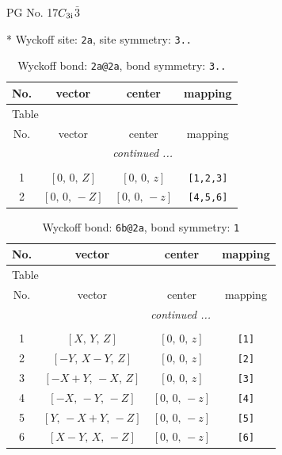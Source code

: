 \documentclass[fleqn,8pt]{jsarticle}
\begin{document}
\setcounter{MaxMatrixCols}{32}

\renewcommand{\tablename}{Table~}
\renewcommand{\figurename}{Figure~}
\begin{center}
\LARGE
PG No. 17\quad$C_{\rm 3i}$\quad$\bar{3}$\quad[ trigonal ]
\end{center}


* Wyckoff site: {\tt 2a}, site symmetry: {\tt 3..}
\renewcommand{\arraystretch}{1.2}
\begin{longtable}{cccc}
\caption{Wyckoff bond: {\tt 2a@2a}, bond symmetry: {\tt 3..}}
 \\
 \hline \hline
No. & vector & center & mapping \\ \hline \endfirsthead

\multicolumn{3}{l}{\tablename\ \thetable{}} \\
 \hline \hline
No. & vector & center & mapping \\ \hline \endhead

 \hline \hline
\multicolumn{3}{r}{\footnotesize\it continued ...} \\ \endfoot

 \hline \hline
\multicolumn{3}{r}{} \\ \endlastfoot

1 & $\left[ 0,\, 0,\, Z \right]$ & $\left[ 0,\, 0,\, z \right]$ & {\tt [1,2,3]} \\ \hline
2 & $\left[ 0,\, 0,\, - Z \right]$ & $\left[ 0,\, 0,\, - z \right]$ & {\tt [4,5,6]} \\
\end{longtable}
\renewcommand{\arraystretch}{1.2}
\begin{longtable}{cccc}
\caption{Wyckoff bond: {\tt 6b@2a}, bond symmetry: {\tt 1}}
 \\
 \hline \hline
No. & vector & center & mapping \\ \hline \endfirsthead

\multicolumn{3}{l}{\tablename\ \thetable{}} \\
 \hline \hline
No. & vector & center & mapping \\ \hline \endhead

 \hline \hline
\multicolumn{3}{r}{\footnotesize\it continued ...} \\ \endfoot

 \hline \hline
\multicolumn{3}{r}{} \\ \endlastfoot

1 & $\left[ X,\, Y,\, Z \right]$ & $\left[ 0,\, 0,\, z \right]$ & {\tt [1]} \\ \hline
2 & $\left[ - Y,\, X - Y,\, Z \right]$ & $\left[ 0,\, 0,\, z \right]$ & {\tt [2]} \\ \hline
3 & $\left[ - X + Y,\, - X,\, Z \right]$ & $\left[ 0,\, 0,\, z \right]$ & {\tt [3]} \\ \hline
4 & $\left[ - X,\, - Y,\, - Z \right]$ & $\left[ 0,\, 0,\, - z \right]$ & {\tt [4]} \\ \hline
5 & $\left[ Y,\, - X + Y,\, - Z \right]$ & $\left[ 0,\, 0,\, - z \right]$ & {\tt [5]} \\ \hline
6 & $\left[ X - Y,\, X,\, - Z \right]$ & $\left[ 0,\, 0,\, - z \right]$ & {\tt [6]} \\
\end{longtable}
\end{document}
